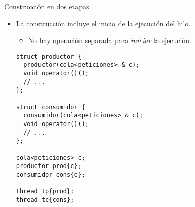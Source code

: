 \begin{frame}[fragile]{Construcción en dos etapas}
\begin{itemize}
  \item La construcción incluye el inicio de la ejecución del hilo.
    \begin{itemize}
      \item No hay operación separada para \emph{iniciar} la ejecución.
    \end{itemize}
\begin{lstlisting}
struct productor {
  productor(cola<peticiones> & c);
  void operator()();
  // ...
};

struct consumidor {
  consumidor(cola<peticiones> & c);
  void operator()();
  // ...
};

cola<peticiones> c;
productor prod{c};
consumidor cons{c};

thread tp{prod};
thread tc{cons};
\end{lstlisting}
\end{itemize}
\end{frame}

